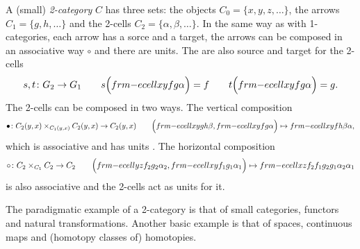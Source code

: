 %
%

A (small) \emph{2-category} $C$ has three sets: the objects $C_0=\{x,y,z,\dots\}$, the arrows $C_1=\{g,h,\dots\}$ and the 2-cells $C_2=\{\alpha,\beta,\dots\}$.
In the same way as with 1-categories, each arrow has a sorce and a target, the arrows can be composed in an associative way $\circ$ and there are units.
The are also source and target for the 2-cells
\[ s,t\colon G_2\to G_1  \qquad s \Big( \2cell{x}{y}{f}{g}{\alpha} \Big) = f  \qquad t \Big( \2cell{x}{y}{f}{g}{\alpha} \Big) = g . \]
The 2-cells can be composed in two ways.
The vertical composition
\[ \bullet\colon C_2(y,x)\times_{C_1(y,x)} C_2(y,x) \to C_2(y,x) \qquad \Big( \2cell{x}{y}{g}{h}{\beta}, \2cell{x}{y}{f}{g}{\alpha} \Big) \mapsto \2cell{x}{y}{f}{h}{\beta\alpha} , \]
which is associative and has units .
The horizontal composition
\[ \circ\colon C_2\times_{C_1}C_2\to C_2 \qquad \Big( \2cell{y}{z}{f_2}{g_2}{\alpha_2}, \2cell{x}{y}{f_1}{g_1}{\alpha_1} \Big) \mapsto \2cell{x}{z}{f_2f_1}{g_2g_1}{\alpha_2\alpha_1} \]
is also associative and the 2-cells  act as units for it.

\smallskip

\begin{example}
The paradigmatic example of a 2-category is that of small categories, functors and natural transformations.
Another basic example is that of spaces, continuous maps and (homotopy classes of) homotopies.
\end{example}

